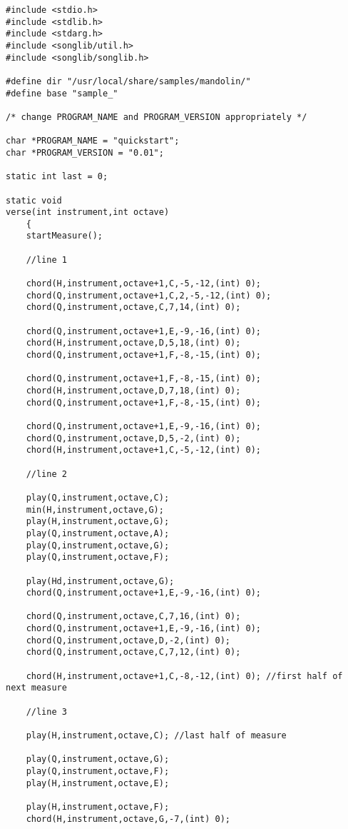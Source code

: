 \documentclass{article}
\begin{document}
\begin{verbatim}
#include <stdio.h>
#include <stdlib.h>
#include <stdarg.h>
#include <songlib/util.h>
#include <songlib/songlib.h>

#define dir "/usr/local/share/samples/mandolin/"
#define base "sample_"

/* change PROGRAM_NAME and PROGRAM_VERSION appropriately */

char *PROGRAM_NAME = "quickstart";
char *PROGRAM_VERSION = "0.01";

static int last = 0;

static void
verse(int instrument,int octave)
    {
    startMeasure();

    //line 1

    chord(H,instrument,octave+1,C,-5,-12,(int) 0);
    chord(Q,instrument,octave+1,C,2,-5,-12,(int) 0);
    chord(Q,instrument,octave,C,7,14,(int) 0);

    chord(Q,instrument,octave+1,E,-9,-16,(int) 0);
    chord(H,instrument,octave,D,5,18,(int) 0);
    chord(Q,instrument,octave+1,F,-8,-15,(int) 0);

    chord(Q,instrument,octave+1,F,-8,-15,(int) 0);
    chord(H,instrument,octave,D,7,18,(int) 0);
    chord(Q,instrument,octave+1,F,-8,-15,(int) 0);

    chord(Q,instrument,octave+1,E,-9,-16,(int) 0);
    chord(Q,instrument,octave,D,5,-2,(int) 0);
    chord(H,instrument,octave+1,C,-5,-12,(int) 0);

    //line 2

    play(Q,instrument,octave,C);
    min(H,instrument,octave,G);
    play(H,instrument,octave,G);
    play(Q,instrument,octave,A);
    play(Q,instrument,octave,G);
    play(Q,instrument,octave,F);

    play(Hd,instrument,octave,G);
    chord(Q,instrument,octave+1,E,-9,-16,(int) 0);

    chord(Q,instrument,octave,C,7,16,(int) 0);
    chord(Q,instrument,octave+1,E,-9,-16,(int) 0);
    chord(Q,instrument,octave,D,-2,(int) 0);
    chord(Q,instrument,octave,C,7,12,(int) 0);

    chord(H,instrument,octave+1,C,-8,-12,(int) 0); //first half of next measure

    //line 3

    play(H,instrument,octave,C); //last half of measure

    play(Q,instrument,octave,G);
    play(Q,instrument,octave,F);
    play(H,instrument,octave,E);

    play(H,instrument,octave,F);
    chord(H,instrument,octave,G,-7,(int) 0);


\end{verbatim}
\end{document}
